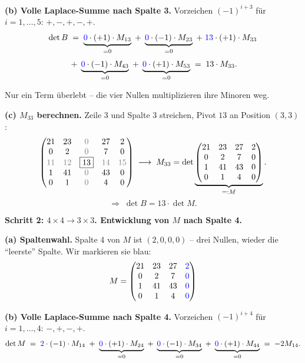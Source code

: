 \documentclass[a4paper,12pt]{article}
\begin{document}
\textbf{(b) Volle Laplace-Summe nach Spalte 3.} Vorzeichen $(-1)^{i+3}$ f\"ur $i = 1, \dots, 5$: $+, -, +, -, +$.
\[
\det B
\;=\; \underbrace{\textcolor{blue}{0} \cdot (+1) \cdot M_{13}}_{= 0}
\;+\; \underbrace{\textcolor{blue}{0} \cdot (-1) \cdot M_{23}}_{= 0}
\;+\; \textcolor{blue}{13} \cdot (+1) \cdot M_{33}
\]
\[
\;+\; \underbrace{\textcolor{blue}{0} \cdot (-1) \cdot M_{43}}_{= 0}
\;+\; \underbrace{\textcolor{blue}{0} \cdot (+1) \cdot M_{53}}_{= 0}
\;=\; 13 \cdot M_{33}.
\]

Nur ein Term \"uberlebt -- die vier Nullen multiplizieren ihre Minoren weg.

\textbf{(c) $M_{33}$ berechnen.} Zeile 3 und Spalte 3 streichen, Pivot $\boxed{13}$ an Position $(3,3)$:
\[
\begin{pmatrix}
21 & 23 & \color{gray}0 & 27 & 2 \\
0 & 2 & \color{gray}0 & 7 & 0 \\
\color{gray}{11} & \color{gray}{12} & \boxed{13} & \color{gray}{14} & \color{gray}{15} \\
1 & 41 & \color{gray}0 & 43 & 0 \\
0 & 1 & \color{gray}0 & 4 & 0
\end{pmatrix}
\;\longrightarrow\;
M_{33} = \det \underbrace{\begin{pmatrix} 21 & 23 & 27 & 2 \\ 0 & 2 & 7 & 0 \\ 1 & 41 & 43 & 0 \\ 0 & 1 & 4 & 0 \end{pmatrix}}_{=: M}.
\]
\[
\Rightarrow\; \det B = 13 \cdot \det M.
\]

\textbf{Schritt 2: $4\times 4 \to 3\times 3$. Entwicklung von $M$ nach Spalte 4.}

\textbf{(a) Spaltenwahl.} Spalte 4 von $M$ ist $(2, 0, 0, 0)$ -- drei Nullen, wieder die ``leerste'' Spalte. Wir markieren sie blau:
\[
M = \begin{pmatrix}
21 & 23 & 27 & \color{blue}{2} \\
0 & 2 & 7 & \color{blue}{0} \\
1 & 41 & 43 & \color{blue}{0} \\
0 & 1 & 4 & \color{blue}{0}
\end{pmatrix}
\]

\textbf{(b) Volle Laplace-Summe nach Spalte 4.} Vorzeichen $(-1)^{i+4}$ f\"ur $i = 1, \dots, 4$: $-, +, -, +$.
\[
\det M
\;=\; \textcolor{blue}{2} \cdot (-1) \cdot M_{14}
\;+\; \underbrace{\textcolor{blue}{0} \cdot (+1) \cdot M_{24}}_{= 0}
\;+\; \underbrace{\textcolor{blue}{0} \cdot (-1) \cdot M_{34}}_{= 0}
\;+\; \underbrace{\textcolor{blue}{0} \cdot (+1) \cdot M_{44}}_{= 0}
\;=\; -2 M_{14}.
\]
\end{document}
